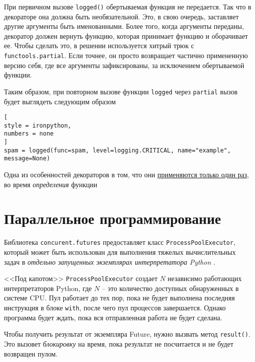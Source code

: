 \documentclass[%
	11pt,
	a4paper,
	utf8,
		]{article}
\begin{document}
При первичном вызове \verb|logged()| обертываемая функция не передается. Так что в декораторе она должна быть необязательной. Это, в свою очередь, заставляет другие аргументы быть именованными. Более того, когда аргументы переданы, декоратор должен вернуть функцию, которая принимает функцию и оборачивает ее. Чтобы сделать это, в решении используется хитрый трюк с \texttt{functools.partial}. Если точнее, он просто возвращает частично примененную версию себя, где все аргументы зафиксированы, за исключением обертываемой функции.

Таким образом, при повторном вызове функции \texttt{logged} через \texttt{partial} вызов будет выглядеть следующим образом
\begin{lstlisting}[
style = ironpython,
numbers = none
]
spam = logged(func=spam, level=logging.CRITICAL, name="example", message=None)
\end{lstlisting}

Одна из особенностей декораторов в том, что они \underline{применяются только один раз}, во время \emph{определения} функции \cite[]{beazley:python_cookbook-2019}

\section{Параллельное программирование}

Библиотека \texttt{concurent.futures} предоставляет класс \texttt{ProcessPoolExecutor}, который может быть использован для выполнения тяжелых вычислительных задач в \emph{отдельно запущенных экземплярах интерпретатора Python} \cite[]{beazley:python_cookbook-2019}.

<<Под капотом>> \texttt{ProcessPoolExecutor} создает $ N $ независимо работающих интерпретаторов Python, где $ N $ -- это количество доступных обнаруженных в системе CPU. Пул работает до тех пор, пока не будет выполнена последняя инструкция в блоке \texttt{with}, после чего пул процессов завершается. Однако программа будет ждать, пока вся отправленная работа не будет сделана.

Чтобы получить результат от экземпляра Future, нужно вызвать метод \texttt{result()}. Это вызовет \emph{блокировку} на время, пока результат не посчитается и не будет возвращен пулом.
\end{document}

